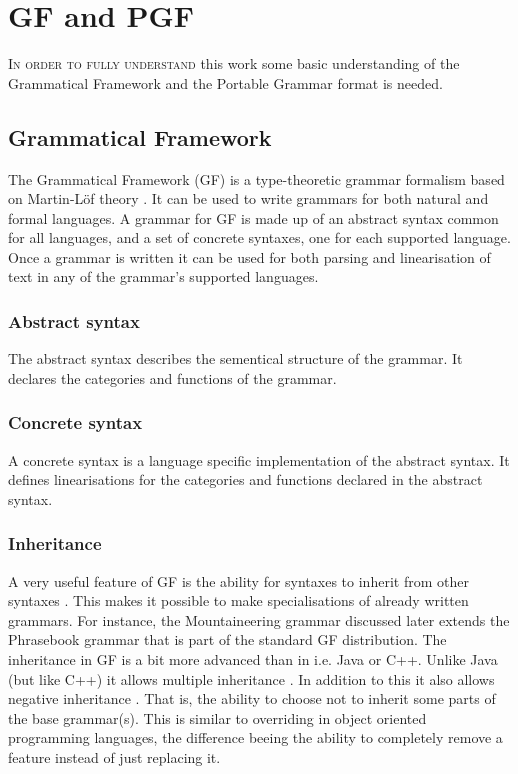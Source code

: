 \chapter{GF and PGF}
\lettrine[lines=4, loversize=-0.1, lraise=0.1]{I}{n order to fully understand} this work some basic understanding of the Grammatical Framework and the Portable Grammar format is needed.

\section{Grammatical Framework}
The Grammatical Framework (GF) is a type-theoretic grammar formalism based on Martin-L\"of theory \cite{martinloftheory}. It can be used to write grammars for both natural and formal languages.
A grammar for GF is made up of an abstract syntax common for all languages, and a set of concrete syntaxes, one for each supported language.
Once a grammar is written it can be used for both parsing and linearisation of text in any of the grammar's supported languages.

\subsection{Abstract syntax}
The abstract syntax describes the sementical structure of the grammar. It declares the categories and functions of the grammar.\cite{gf}

\subsection{Concrete syntax}
A concrete syntax is a language specific implementation of the abstract syntax. It defines linearisations for the categories and functions declared in the abstract syntax. \cite{gf}

\subsection{Inheritance}
A very useful feature of GF is the ability for syntaxes to inherit from other syntaxes \cite{gf}. This makes it possible to make specialisations of already written grammars. For instance, the Mountaineering grammar discussed later extends the Phrasebook grammar that is part of the standard GF distribution.
The inheritance in GF is a bit more advanced than in i.e. Java or C++. Unlike Java (but like C++) it allows multiple inheritance \cite{javalangspec} \cite{cxx11}. In addition to this it also allows negative inheritance \cite{gf}. That is, the ability to choose not to inherit some parts of the base grammar(s). This is similar to overriding in object oriented programming languages, the difference beeing the ability to completely remove a feature instead of just replacing it.

